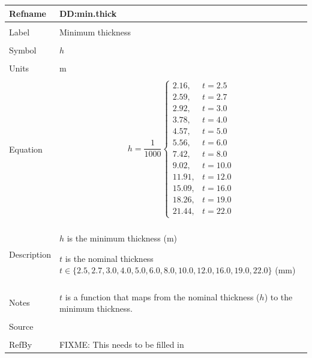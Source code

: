 \documentclass[12pt]{article}
\begin{document}
\noindent \begin{minipage}{\textwidth}
\begin{tabular}{p{} p{}}
\toprule \textbf{Refname} & \textbf{DD:min.thick}
\label{DD:min.thick}
\\ \midrule \\
Label & Minimum thickness
\\ \midrule \\
Symbol & $h$
\\ \midrule \\
Units & m
\\ \midrule \\
Equation & \begin{dmath}
           h=\frac{1}{1000} \begin{cases}
2.16, & t=2.5\\
2.59, & t=2.7\\
2.92, & t=3.0\\
3.78, & t=4.0\\
4.57, & t=5.0\\
5.56, & t=6.0\\
7.42, & t=8.0\\
9.02, & t=10.0\\
11.91, & t=12.0\\
15.09, & t=16.0\\
18.26, & t=19.0\\
21.44, & t=22.0
\end{cases}
           \end{dmath}
\\ \midrule \\
Description & \begin{symbDescription}
              \item{$h$ is the minimum thickness (m)}
              \item{$t$ is the nominal thickness $t\in{}\{2.5,2.7,3.0,4.0,5.0,6.0,8.0,10.0,12.0,16.0,19.0,22.0\}$ (mm)}
              \end{symbDescription}
\\ \midrule \\
Notes & $t$ is a function that maps from the nominal thickness ($h$) to the minimum thickness.
\\ \midrule \\
Source & 
\\ \midrule \\
RefBy & FIXME: This needs to be filled in
\\ \bottomrule \end{tabular}
\end{minipage}\\
\end{document}
